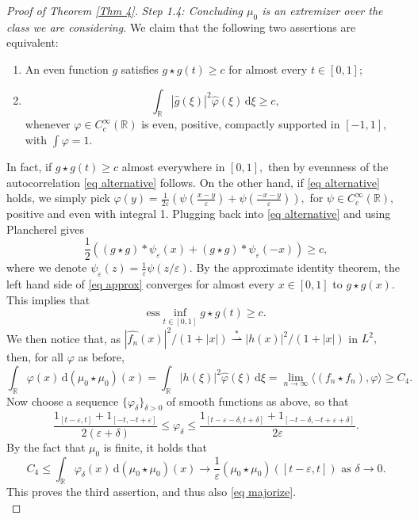\documentclass[11pt, reqno]{amsart}
\newcommand{\mmd}{ \mathrm{d}}
\newcommand{\s}{\star}
\numberwithin{equation}{section}
\newcommand{\R}{{\mathbb R}}
\newcommand{\eps}{{\varepsilon}}
\begin{document}
\begin{proof}[Proof of Theorem \ref{Thm 4}]
\noindent\textit{Step 1.4: Concluding $\mu_0$ is an extremizer over the class we are considering.} We claim that the following two assertions are equivalent:
\begin{enumerate} 
 \item An even function $g$ satisfies $g \star g(t) \ge c$ for almost every $t \in [0,1];$ 
 \item \begin{equation}\label{eq alternative}
\int_{\R} |\widehat{g}(\xi)|^2 \widehat{\varphi}(\xi) \, \mmd \xi \ge c, 
\end{equation}
whenever $\varphi \in C^{\infty}_c(\R)$ is even, positive, compactly supported in $[-1,1],$ with $\int \varphi = 1.$
\end{enumerate}

 In fact, if $g\star g(t) \ge c$ almost everywhere in $[0,1],$ then by evennness of the autocorrelation \eqref{eq alternative} follows. On the other hand, if \eqref{eq alternative} 
holds, we simply pick $\varphi(y) = \frac{1}{2\eps} \left(\psi\left(\frac{x-y}{\eps}\right) + \psi\left(\frac{-x-y}{\eps}\right)\right),$ for $\psi \in C^{\infty}_c(\R),$ positive and even with integral 1. Plugging back into \eqref{eq alternative} and using Plancherel gives 
\begin{equation}\label{eq approx}
\frac{1}{2}((g \star g)*\psi_{\eps}(x) +(g\star g)*\psi_{\eps}(-x)) \ge c,
\end{equation}
where we denote $\psi_{\eps}(z) = \frac{1}{\eps}\psi(z/\eps).$ By the approximate identity theorem, the left hand side of \eqref{eq approx} converges for almost every $x \in [0,1]$ to $g \star g(x).$ This implies that 
\[
\text{ess}\inf_{t \in [0,1]} g\star g(t) \ge c.
\]
We then notice that, as $|\widehat{f_n}(x)|^2/(1+|x|) \overset{\ast}{\rightharpoonup} |h(x)|^2/(1+|x|)$ in $L^2,$ then, for all $\varphi$ as before, 
\[
\int_{\R} \varphi(x) \, \mmd (\mu_0 \star \mu_0)(x) = \int_{\R} |h(\xi)|^2 \widehat{\varphi}(\xi) \, \mmd \xi = \lim_{n \to \infty} \langle (f_n \s f_n), \varphi \rangle \ge C_4. 
\]
Now choose a sequence $\{\varphi_{\delta}\}_{\delta > 0}$ of smooth functions as above, so that 
\[
\frac{1_{[t-\eps,t]} + 1_{[-t,-t+\eps]}}{2(\eps+\delta)} \le \varphi_{\delta} \le \frac{1_{[t-\eps-\delta,t+\delta]} + 1_{[-t-\delta,-t+\eps+\delta]}}{2\eps}.
\]
By the fact that $\mu_0$ is finite, it holds that 
\[
C_4 \le \int_{\R} \varphi_{\delta}(x) \, \mmd (\mu_0 \s \mu_0)(x) \to \frac{1}{\eps}(\mu_0 \s \mu_0)([t-\eps,t]) \text{ as } \delta \to 0.
\]
This proves the third assertion, and thus also \eqref{eq majorize}. \\


\end{proof}
\end{document}
